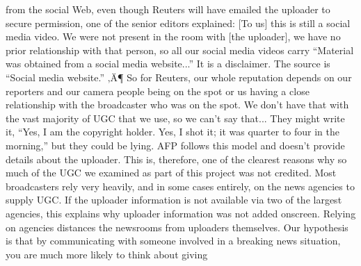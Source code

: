 \documentclass[symmetric, notoc, nobib]{towcenter-book}
\begin{document}
\begin{enumerate}
from the social Web, even though Reuters will have emailed the uploader to
secure permission, one of the senior editors explained:
[To us] this is still a social media video. We were not present in the
room with [the uploader], we have no prior relationship with that
person, so all our social media videos carry ``Material was obtained
from a social media website...'' It is a disclaimer. The source is ``Social
media website.'' ‚Ä¶ So for Reuters, our whole reputation depends on
our reporters and our camera people being on the spot or us having
a close relationship with the broadcaster who was on the spot. We
don't have that with the vast majority of UGC that we use, so we can't
say that... They might write it, ``Yes, I am the copyright holder. Yes, I
shot it; it was quarter to four in the morning,'' but they could be lying.
AFP follows this model and doesn't provide details about the uploader. This
is, therefore, one of the clearest reasons why so much of the UGC we examined
as part of this project was not credited. Most broadcasters rely very
heavily, and in some cases entirely, on the news agencies to supply UGC. If
the uploader information is not available via two of the largest agencies, this
explains why uploader information was not added onscreen.
Relying on agencies distances the newsrooms from uploaders themselves.
Our hypothesis is that by communicating with someone involved in a
breaking news situation, you are much more likely to think about giving


\end{enumerate}
\end{document}
